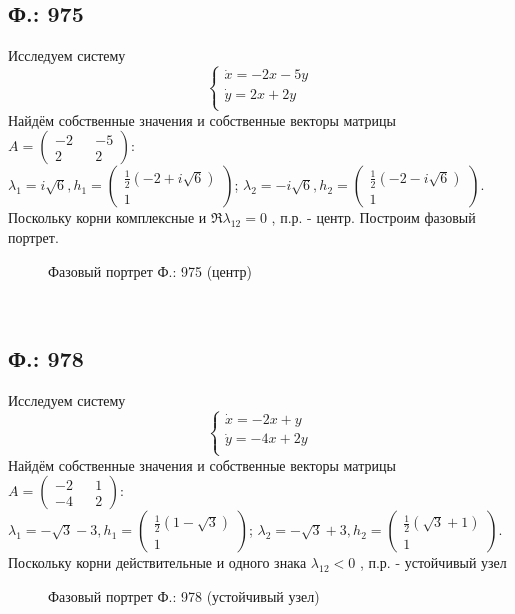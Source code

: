 \documentclass{article}
\begin{document}
\subsection{Ф.: 975}
Исследуем систему 
\begin{equation}
\begin{cases}
        \dot{x}=-2x-5y\\
        \dot{y}=2x+2y\\
    \end{cases}    
\end{equation}
Найдём собственные значения и собственные векторы матрицы $A=\begin{pmatrix}-2 && -5 \\ 2 && 2 \end{pmatrix}$:\\
 $\lambda_1= i\sqrt6,h_1 = \begin{pmatrix} \frac{1}{2} \left(-2+i \sqrt{6}\right)  \\  1 \end{pmatrix} $; $\lambda_2= -i\sqrt6,h_2 = \begin{pmatrix} \frac{1}{2} \left(-2-i \sqrt{6}\right)  \\  1 \end{pmatrix} $. Поскольку корни комплексные и $\Re{\lambda_{12}}=0$ , п.р. - центр. Построим фазовый портрет.
 \begin{figure}[ht]
\caption{Фазовый портрет Ф.: 975 (центр)}
\label{975}
\end{figure}\\

\subsection{Ф.: 978}
Исследуем систему 
\begin{equation}
\begin{cases}
        \dot{x}=-2x+y\\
        \dot{y}=-4x+2y\\
    \end{cases}    
\end{equation}
Найдём собственные значения и собственные векторы матрицы $A=\begin{pmatrix}-2 && 1 \\ -4 && 2 \end{pmatrix}$:\\
 $\lambda_1=-\sqrt{3}-3,
 h_1 = \begin{pmatrix} \frac{1}{2} \left(1-\sqrt{3}\right)  \\  1 \end{pmatrix} $; 
 $\lambda_2= -\sqrt{3}+3,
 h_2 = \begin{pmatrix} \frac{1}{2} \left(\sqrt{3}+1\right)  \\  1 \end{pmatrix} $. 
 Поскольку корни действительные и одного знака $\lambda_{12}<0$ 
 , п.р. - устойчивый узел
 \begin{figure}[ht]
\caption{Фазовый портрет Ф.: 978 (устойчивый узел)}
\label{978}
\end{figure}\\
\end{document}
